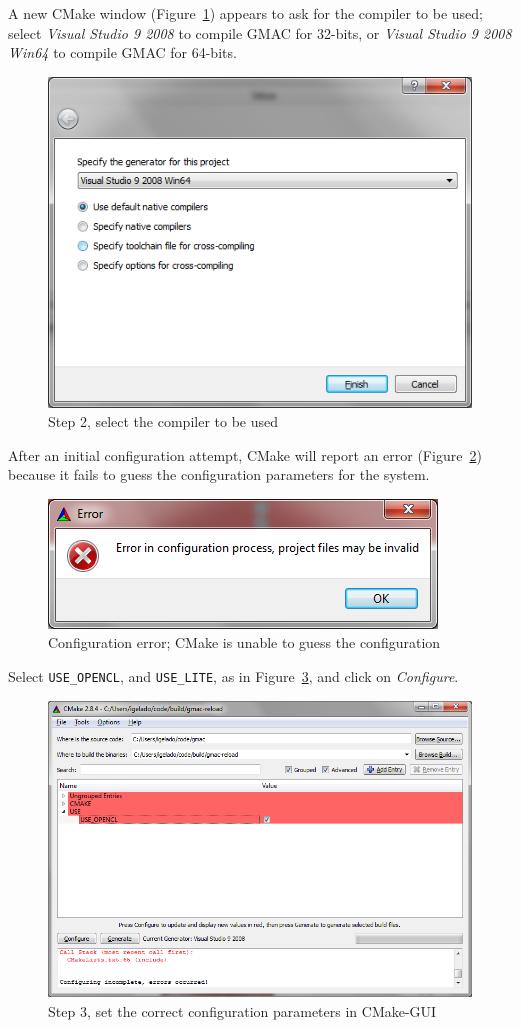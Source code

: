 A new CMake window (Figure~\ref{fig:install:cmake-compiler}) appears to ask for the compiler to be 
used; select \emph{Visual Studio 9 2008} to compile GMAC for 32\hyp{}bits, or \emph{Visual Studio 9 
2008 Win64} to compile GMAC for 64\hyp{}bits.
\begin{figure}[h]
\centering
\includegraphics[width=0.6\linewidth]{installation/figures/cmake-compiler}
\caption{Step 2, select the compiler to be used}
\label{fig:install:cmake-compiler}
\end{figure}

After an initial configuration attempt, CMake will report an error 
(Figure~\ref{fig:install:cmake-conf-error}) because it fails to guess the configuration parameters 
for the system.
\begin{figure}[h]
\centering
\includegraphics[width=0.5\linewidth]{installation/figures/cmake-conf-error}
\caption{Configuration error; CMake is unable to guess the configuration}
\label{fig:install:cmake-conf-error}
\end{figure}

Select \texttt{USE\_OPENCL}, and \texttt{USE\_LITE}, as in Figure~\ref{fig:install:cmake-opencl}, 
and click on \emph{Configure}.
\begin{figure}[h]
\centering
\includegraphics[width=0.8\linewidth]{installation/figures/cmake-opencl}
\caption{Step 3, set the correct configuration parameters in CMake\hyp{}GUI}
\label{fig:install:cmake-opencl}
\end{figure}

